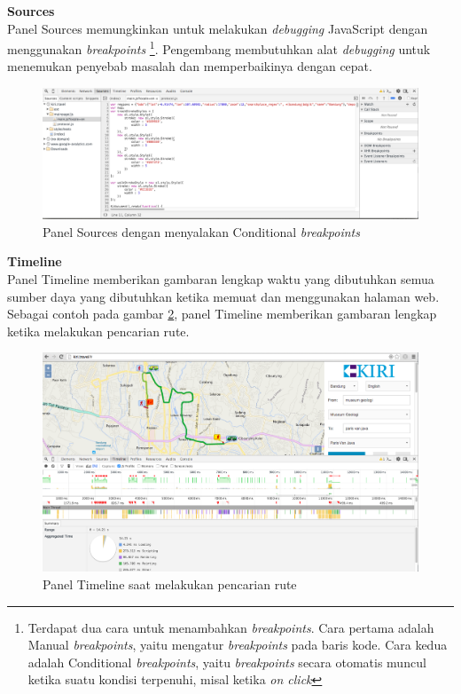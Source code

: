 \documentclass[a4paper,twoside]{article}
\begin{document}
\textbf{Sources}\\
Panel Sources memungkinkan untuk melakukan \textit{debugging} JavaScript dengan menggunakan \textit{breakpoints} \footnote{Terdapat dua cara untuk menambahkan \textit{breakpoints}. Cara pertama adalah Manual \textit{breakpoints}, yaitu mengatur \textit{breakpoints} pada baris kode. Cara kedua adalah Conditional \textit{breakpoints}, yaitu \textit{breakpoints} secara otomatis muncul ketika suatu kondisi terpenuhi, misal ketika \textit{on click}}. Pengembang membutuhkan alat \textit{debugging} untuk menemukan penyebab masalah dan memperbaikinya dengan cepat.

\begin{figure}[H]
	\centering
	\includegraphics[scale=0.3]{Gambar/devtools-sources}
	\caption{Panel Sources dengan menyalakan Conditional \textit{breakpoints}} 
	\label{fig:2_devtools_sources}
\end{figure}

\textbf{Timeline}\\
Panel Timeline memberikan gambaran lengkap waktu yang dibutuhkan semua sumber daya yang dibutuhkan ketika memuat dan menggunakan halaman web. Sebagai contoh pada gambar \ref{fig:2_devtools_timeline}, panel Timeline memberikan gambaran lengkap ketika melakukan pencarian rute. 

\begin{figure}[H]
	\centering
	\includegraphics[scale=0.3]{Gambar/devtools-timeline}
	\caption{Panel Timeline saat melakukan pencarian rute} 
	\label{fig:2_devtools_timeline}
\end{figure}
\end{document}
